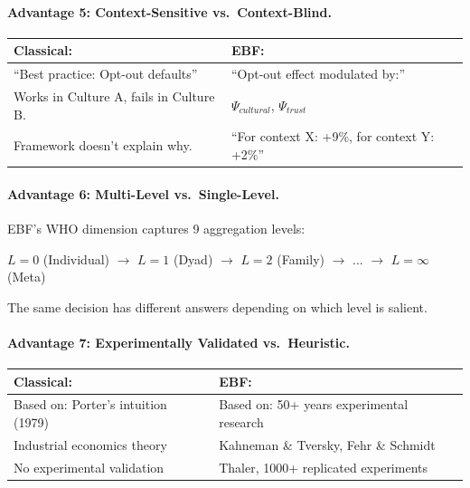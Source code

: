 \paragraph{Advantage 5: Context-Sensitive vs.\ Context-Blind.}

\begin{center}
\begin{tabular}{@{}p{6.5cm}p{6.5cm}@{}}
\textbf{Classical:} & \textbf{EBF:} \\
\midrule
``Best practice: Opt-out defaults'' & ``Opt-out effect modulated by:'' \\
Works in Culture A, fails in Culture B. & $\Psi_{cultural}$, $\Psi_{trust}$ \\
Framework doesn't explain why. & ``For context X: +9\%, for context Y: +2\%'' \\
\end{tabular}
\end{center}

\paragraph{Advantage 6: Multi-Level vs.\ Single-Level.}

EBF's WHO dimension captures 9 aggregation levels:
\begin{center}
$L=0$ (Individual) $\rightarrow$ $L=1$ (Dyad) $\rightarrow$ $L=2$ (Family) $\rightarrow$ ... $\rightarrow$ $L=\infty$ (Meta)
\end{center}
The same decision has different answers depending on which level is salient.

\paragraph{Advantage 7: Experimentally Validated vs.\ Heuristic.}

\begin{center}
\begin{tabular}{@{}p{6.5cm}p{6.5cm}@{}}
\textbf{Classical:} & \textbf{EBF:} \\
\midrule
Based on: Porter's intuition (1979) & Based on: 50+ years experimental research \\
Industrial economics theory & Kahneman \& Tversky, Fehr \& Schmidt \\
No experimental validation & Thaler, 1000+ replicated experiments \\
\end{tabular}
\end{center}

